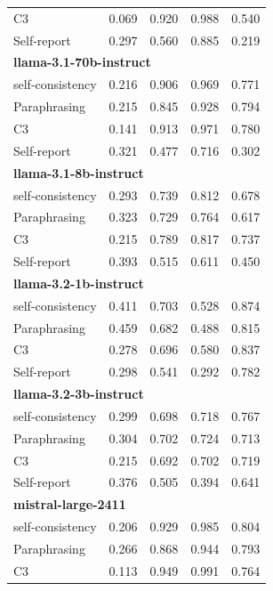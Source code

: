 \documentclass[11pt]{article}
\theoremstyle{plain}
\theoremstyle{definition}
\theoremstyle{remark}
\begin{document}
\begin{table}[p]
\begin{minipage}[t]{0.48\textwidth}
\begin{tabular}{lcccc}
       C3             & 0.069 & 0.920 & 0.988 & 0.540 \\
        Self-report      & 0.297 & 0.560 & 0.885 & 0.219 \\
        \midrule
        \multicolumn{5}{l}{\textbf{llama-3.1-70b-instruct}} \\
        self-consistency & 0.216 & 0.906 & 0.969 & 0.771 \\
        Paraphrasing     & 0.215 & 0.845 & 0.928 & 0.794 \\
       C3             & 0.141 & 0.913 & 0.971 & 0.780 \\
        Self-report      & 0.321 & 0.477 & 0.716 & 0.302 \\
        \midrule
        \multicolumn{5}{l}{\textbf{llama-3.1-8b-instruct}} \\
        self-consistency & 0.293 & 0.739 & 0.812 & 0.678 \\
        Paraphrasing     & 0.323 & 0.729 & 0.764 & 0.617 \\
       C3             & 0.215 & 0.789 & 0.817 & 0.737 \\
        Self-report      & 0.393 & 0.515 & 0.611 & 0.450 \\
        \midrule
        \multicolumn{5}{l}{\textbf{llama-3.2-1b-instruct}} \\
        self-consistency & 0.411 & 0.703 & 0.528 & 0.874 \\
        Paraphrasing     & 0.459 & 0.682 & 0.488 & 0.815 \\
       C3             & 0.278 & 0.696 & 0.580 & 0.837 \\
        Self-report      & 0.298 & 0.541 & 0.292 & 0.782 \\
        \midrule
        \multicolumn{5}{l}{\textbf{llama-3.2-3b-instruct}} \\
        self-consistency & 0.299 & 0.698 & 0.718 & 0.767 \\
        Paraphrasing     & 0.304 & 0.702 & 0.724 & 0.713 \\
       C3             & 0.215 & 0.692 & 0.702 & 0.719 \\
        Self-report      & 0.376 & 0.505 & 0.394 & 0.641 \\
        \midrule
        \multicolumn{5}{l}{\textbf{mistral-large-2411}} \\
        self-consistency & 0.206 & 0.929 & 0.985 & 0.804 \\
        Paraphrasing     & 0.266 & 0.868 & 0.944 & 0.793 \\
       C3             & 0.113 & 0.949 & 0.991 & 0.764 \\

\end{tabular}
\end{minipage}
\end{table}
\end{document}
